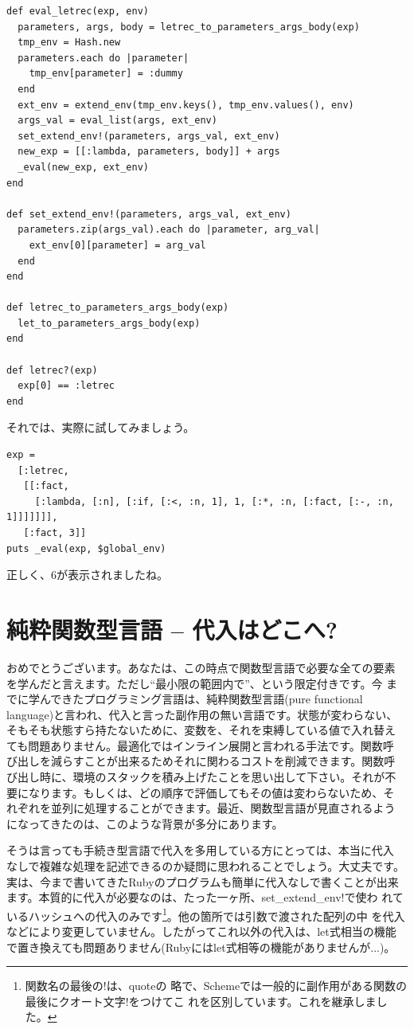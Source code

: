 \begin{lstlisting}
def eval_letrec(exp, env)
  parameters, args, body = letrec_to_parameters_args_body(exp)
  tmp_env = Hash.new
  parameters.each do |parameter| 
    tmp_env[parameter] = :dummy
  end
  ext_env = extend_env(tmp_env.keys(), tmp_env.values(), env)
  args_val = eval_list(args, ext_env)
  set_extend_env!(parameters, args_val, ext_env)
  new_exp = [[:lambda, parameters, body]] + args
  _eval(new_exp, ext_env)
end

def set_extend_env!(parameters, args_val, ext_env)
  parameters.zip(args_val).each do |parameter, arg_val|
    ext_env[0][parameter] = arg_val
  end
end

def letrec_to_parameters_args_body(exp)
  let_to_parameters_args_body(exp)
end

def letrec?(exp)
  exp[0] == :letrec
end
\end{lstlisting}

それでは、実際に試してみましょう。

\begin{lstlisting}
exp =
  [:letrec, 
   [[:fact,
     [:lambda, [:n], [:if, [:<, :n, 1], 1, [:*, :n, [:fact, [:-, :n, 1]]]]]]], 
   [:fact, 3]]
puts _eval(exp, $global_env)
\end{lstlisting}

正しく、6が表示されましたね。

\section{純粋関数型言語 -- 代入はどこへ?}

おめでとうございます。あなたは、この時点で関数型言語で必要な全ての要素
を学んだと言えます。ただし“最小限の範囲内で”、という限定付きです。今
までに学んできたプログラミング言語は、純粋関数型言語(pure functional
language)と言われ、代入と言った副作用の無い言語です。状態が変わらない、
そもそも状態すら持たないために、変数を、それを束縛している値で入れ替え
ても問題ありません。最適化ではインライン展開と言われる手法です。関数呼
び出しを減らすことが出来るためそれに関わるコストを削減できます。関数呼
び出し時に、環境のスタックを積み上げたことを思い出して下さい。それが不
要になります。もしくは、どの順序で評価してもその値は変わらないため、そ
れぞれを並列に処理することができます。最近、関数型言語が見直されるよう
になってきたのは、このような背景が多分にあります。

そうは言っても手続き型言語で代入を多用している方にとっては、本当に代入
なしで複雑な処理を記述できるのか疑問に思われることでしょう。大丈夫です。
実は、今まで書いてきたRubyのプログラムも簡単に代入なしで書くことが出来
ます。本質的に代入が必要なのは、たった一ヶ所、set\_extend\_env!で使わ
れているハッシュへの代入のみです\footnote{関数名の最後の!は、quoteの
略で、Schemeでは一般的に副作用がある関数の最後にクオート文字!をつけてこ
れを区別しています。これを継承しました。}。他の箇所では引数で渡された配列の中
を代入などにより変更していません。したがってこれ以外の代入は、let式相当の機能
で置き換えても問題ありません(Rubyにはlet式相等の機能がありませんが...)。

